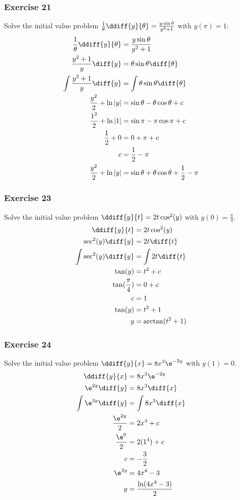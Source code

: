 \documentclass{math}
\begin{document}
\subsubsection*{Exercise 21}
Solve the initial value problem \( \frac{1}{\theta}\ddiff{y}{\theta} =
\frac{y\sin\theta}{y^2+1} \) with \( y(\pi) = 1 \):
\begin{align*}
  \frac{1}{\theta}\ddiff{y}{\theta} &= \frac{y\sin\theta}{y^2+1} \\
  \frac{y^2+1}{y}\diff{y} &= \theta\sin\theta\diff{\theta} \\
  \int\frac{y^2+1}{y}\diff{y} &= \int\theta\sin\theta\diff{\theta} \\
  \frac{y^2}{2}+\ln|y| &= \sin\theta-\theta\cos\theta+c \\
  \frac{1^2}{2}+\ln|1| &= \sin\pi-\pi\cos\pi+c \\
  \frac{1}{2}+0 &= 0+\pi+c \\
  c &= \frac{1}{2}-\pi \\
  \frac{y^2}{2}+\ln|y| &= \sin\theta+\theta\cos\theta+\frac{1}{2}-\pi
\end{align*}

\subsubsection*{Exercise 23}
Solve the initial value problem \( \ddiff{y}{t} = 2t\cos^2(y) \) with \( y(0) =
\frac{\pi}{4} \).
\begin{align*}
  \ddiff{y}{t} &= 2t\cos^2(y) \\
  \sec^2(y)\diff{y} &= 2t\diff{t} \\
  \int\sec^2(y)\diff{y} &= \int 2t\diff{t} \\
  \tan(y) &= t^2+c \\
  \tan(\frac{\pi}{4}) &= 0+c \\
  c &= 1 \\
  \tan(y) &= t^2+1 \\
  y &= \arctan(t^2+1)
\end{align*}

\subsubsection*{Exercise 24}
Solve the initial value problem \( \ddiff{y}{x} = 8x^3\e^{-2y} \) with \( y(1) =
0 \).
\begin{align*}
  \ddiff{y}{x} &= 8x^3\e^{-2y} \\
  \e^{2y}\diff{y} &= 8x^3\diff{x} \\
  \int\e^{2y}\diff{y} &= \int 8x^3\diff{x} \\
  \frac{\e^{2y}}{2} &= 2x^4+c \\
  \frac{\e^0}{2} &= 2(1^4)+c \\
  c &= -\frac{3}{2} \\
  \e^{2y} &= 4x^4-3 \\
  y &= \frac{\ln(4x^4-3)}{2}
\end{align*}
\end{document}
